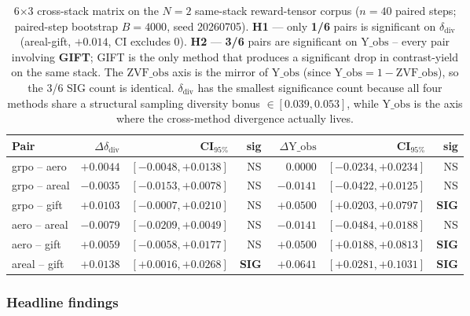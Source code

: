 \begin{table}[h]
\centering
\footnotesize
\begin{tabular}{l r r r r r r}
\toprule
\textbf{Pair} & $\Delta\delta_{\mathrm{div}}$ & CI$_{95\%}$ & sig
            & $\Delta\mathrm{Y\_obs}$ & CI$_{95\%}$ & sig \\
\midrule
grpo -- aero  & $+0.0044$ & $[-0.0048,+0.0138]$ & NS  & $\phantom{-}0.0000$ & $[-0.0234,+0.0234]$ & NS  \\
grpo -- areal & $-0.0035$ & $[-0.0153,+0.0078]$ & NS  & $-0.0141$            & $[-0.0422,+0.0125]$ & NS  \\
grpo -- gift  & $+0.0103$ & $[-0.0007,+0.0210]$ & NS  & $+0.0500$            & $[+0.0203,+0.0797]$ & \textbf{SIG} \\
aero -- areal & $-0.0079$ & $[-0.0209,+0.0049]$ & NS  & $-0.0141$            & $[-0.0484,+0.0188]$ & NS  \\
aero -- gift  & $+0.0059$ & $[-0.0058,+0.0177]$ & NS  & $+0.0500$            & $[+0.0188,+0.0813]$ & \textbf{SIG} \\
areal -- gift & $+0.0138$ & $[+0.0016,+0.0268]$ & \textbf{SIG} & $+0.0641$ & $[+0.0281,+0.1031]$ & \textbf{SIG} \\
\bottomrule
\end{tabular}
\caption{6$\times$3 cross-stack matrix on the $N\!=\!2$ same-stack
reward-tensor corpus ($n\!=\!40$ paired steps; paired-step bootstrap
$B\!=\!4000$, seed 20260705).
\textbf{H1} --- only \textbf{1/6} pairs is significant on
$\delta_{\mathrm{div}}$ (areal-gift, $+0.014$, CI excludes 0).
\textbf{H2} --- \textbf{3/6} pairs are significant on
$\mathrm{Y\_obs}$ -- every pair involving \textbf{GIFT};
GIFT is the only method that produces a significant drop in
contrast-yield on the same stack. The $\mathrm{ZVF\_obs}$ axis is
the mirror of $\mathrm{Y\_obs}$ (since $\mathrm{Y\_obs}=1-\mathrm{ZVF\_obs}$),
so the 3/6 SIG count is identical.
$\delta_{\mathrm{div}}$ has the smallest significance count
because all four methods share a structural sampling diversity
bonus $\in [0.039,0.053]$, while $\mathrm{Y\_obs}$ is the axis
where the cross-method divergence actually lives.}
\label{tab:p6-iter86-matrix}
\end{table}

\subsubsection{Headline findings}

